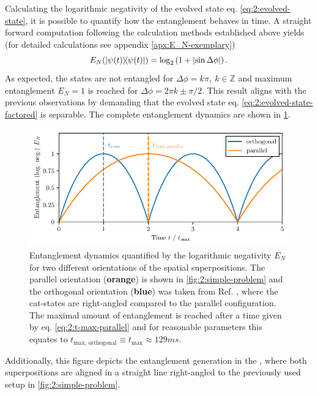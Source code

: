 Calculating the logarithmic negativity of the evolved state eq. \eqref{eq:2:evolved-state}, it is possible to quantify how the entanglement behaves in time. A straight forward computation following the calculation methods established above yields (for detailed calculations see appendix \ref{apx:E_N-exemplary})
\begin{equation}\label{eq:2:entanglement-dynamics-parallel}
  E_N(\ketbra{\psi(t)}) = \log_2\left(1 + \left\lvert\sin \Delta\phi\right\rvert\right) .
\end{equation}
As expected, the states are not entangled for $\Delta\phi = k\pi, \ k\in\mathbb{Z}$ and maximum entanglement $E_N = 1$  is reached
for $\Delta\phi = 2\pi k \pm \pi/2$.
This result aligns with the previous observations by
demanding that the evolved state eq. \eqref{eq:2:evolved-state-factored}  is separable.
The complete entanglement dynamics are shown in \cref{fig:2:entanglement-dynamics}.
\begin{figure}[!htbp]
  \centering
  \includegraphics[width=\textwidth]{./../figures/ideal-entanglement/EN-time.pdf}
  \caption{Entanglement dynamics quantified by the logarithmic negativity $E_N$ for two different orientations of the spatial superpositions. The parallel orientation (\textbf{orange}) is shown in \cref{fig:2:simple-problem} and the orthogonal orientation (\textbf{blue}) was taken from Ref. \cite{Pedernales_2023}, where the cat-states are right-angled compared to the parallel configuration. The maximal amount of entanglement is reached after a time given by eq. \eqref{eq:2:t-max-parallel} and for reasonable parameters this equates to $t_\mathrm{max,\,orthogonal} \equiv t_\mathrm{max} \approx 129\si{ms}$.}
  \label{fig:2:entanglement-dynamics}
\end{figure}
Additionally, this figure depicts the entanglement generation in the , where both superpositions are aligned in a straight line right-angled to the previously used setup in \cref{fig:2:simple-problem}.


